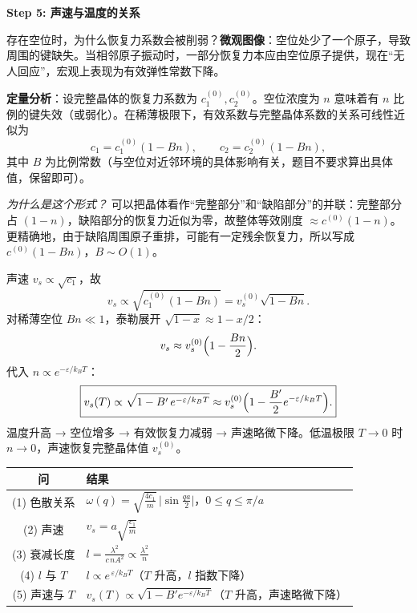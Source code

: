 \begin{derivationbox}[标准解题过程]
\textbf{Step 5: 声速与温度的关系}

存在空位时，为什么恢复力系数会被削弱？\textbf{微观图像}：空位处少了一个原子，导致周围的键缺失。当相邻原子振动时，一部分恢复力本应由空位原子提供，现在``无人回应''，宏观上表现为有效弹性常数下降。

\textbf{定量分析}：设完整晶体的恢复力系数为 $c_1^{(0)},c_2^{(0)}$。空位浓度为 $n$ 意味着有 $n$ 比例的键失效（或弱化）。在稀薄极限下，有效系数与完整晶体系数的关系可线性近似为
\begin{equation}
c_1 = c_1^{(0)}(1-Bn), \qquad c_2 = c_2^{(0)}(1-Bn),
\end{equation}
其中 $B$ 为比例常数（与空位对近邻环境的具体影响有关，题目不要求算出具体值，保留即可）。

\textit{为什么是这个形式？} 可以把晶体看作``完整部分''和``缺陷部分''的并联：完整部分占 $(1-n)$，缺陷部分的恢复力近似为零，故整体等效刚度 $\approx c^{(0)}(1-n)$。更精确地，由于缺陷周围原子重排，可能有一定残余恢复力，所以写成 $c^{(0)}(1-Bn)$，$B\sim O(1)$。

声速 $v_s\propto\sqrt{c_1}$，故
\begin{equation}
v_s \propto \sqrt{c_1^{(0)}(1-Bn)} = v_s^{(0)}\sqrt{1-Bn}.
\end{equation}
对稀薄空位 $Bn\ll1$，泰勒展开 $\sqrt{1-x}\approx 1-x/2$：
\begin{equation}
v_s \approx v_s^{(0)}\Bigl(1-\frac{Bn}{2}\Bigr).
\end{equation}
代入 $n\propto e^{-\varepsilon/k_BT}$：
\begin{equation}
\boxed{v_s(T) \propto \sqrt{1-B'\,e^{-\varepsilon/k_BT}} \approx v_s^{(0)}\Bigl(1-\frac{B'}{2}e^{-\varepsilon/k_BT}\Bigr).}
\end{equation}
温度升高 → 空位增多 → 有效恢复力减弱 → 声速略微下降。低温极限 $T\to0$ 时 $n\to0$，声速恢复完整晶体值 $v_s^{(0)}$。
\end{derivationbox}

\begin{formulabox}[答案汇总]
\begin{center}
\begin{tabular}{cl}
\toprule
问 & 结果 \\
\midrule
(1) 色散关系 & $\displaystyle \omega(q)=\sqrt{\frac{4c_1}{m}}\,\bigl|\sin\tfrac{qa}{2}\bigr|$，$0\le q\le\pi/a$ \\[8pt]
(2) 声速 & $\displaystyle v_s = a\sqrt{\frac{c_1}{m}}$ \\[8pt]
(3) 衰减长度 & $\displaystyle l = \frac{\lambda^2}{c\,nA^2}\propto\frac{\lambda^2}{n}$ \\[8pt]
(4) $l$ 与 $T$ & $\displaystyle l\propto e^{\,\varepsilon/k_BT}$（$T$ 升高，$l$ 指数下降） \\[8pt]
(5) 声速与 $T$ & $\displaystyle v_s(T)\propto\sqrt{1-B'e^{-\varepsilon/k_BT}}$（$T$ 升高，声速略微下降） \\
\bottomrule
\end{tabular}
\end{center}
\end{formulabox}

